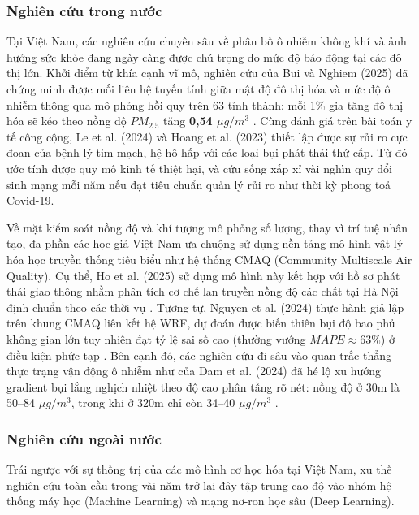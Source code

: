 \subsubsection{Nghiên cứu trong nước}

Tại Việt Nam, các nghiên cứu chuyên sâu về phân bố ô nhiễm không khí và ảnh hưởng sức khỏe đang ngày càng được chú trọng do mức độ báo động tại các đô thị lớn. Khởi điểm từ khía cạnh vĩ mô, nghiên cứu của Bui và Nghiem (2025) đã chứng minh được mối liên hệ tuyến tính giữa mật độ đô thị hóa và mức độ ô nhiễm thông qua mô phỏng hồi quy trên 63 tỉnh thành: mỗi 1\% gia tăng đô thị hóa sẽ kéo theo nồng độ $PM_{2.5}$ tăng \textbf{0,54 $\mu g/m^3$} \cite{bui2025urbanization}. Cùng đánh giá trên bài toán y tế công cộng, Le et al. (2024) \cite{le2024environmental} và Hoang et al. (2023) \cite{hoang2023health} thiết lập được sự rủi ro cực đoan của bệnh lý tim mạch, hệ hô hấp với các loại bụi phát thải thứ cấp. Từ đó ước tính được quy mô kinh tế thiệt hại, và cứu sống xấp xỉ vài nghìn quy đổi sinh mạng mỗi năm nếu đạt tiêu chuẩn quản lý rủi ro như thời kỳ phong toả Covid-19. 

Về mặt kiểm soát nồng độ và khí tượng mô phỏng số lượng, thay vì trí tuệ nhân tạo, đa phần các học giả Việt Nam ưa chuộng sử dụng nền tảng mô hình vật lý - hóa học truyền thống tiêu biểu như hệ thống CMAQ (Community Multiscale Air Quality). 
Cụ thể, Ho et al. (2025) sử dụng mô hình này kết hợp với hồ sơ phát thải giao thông nhằm phân tích cơ chế lan truyền nồng độ các chất tại Hà Nội định chuẩn theo các thời vụ \cite{ho2025assessment}. Tương tự, Nguyen et al. (2024) thực hành giả lập trên khung CMAQ liên kết hệ WRF, dự đoán được biến thiên bụi độ bao phủ không gian lớn tuy nhiên đạt tỷ lệ sai số cao (thường vướng $MAPE \approx 63\%$) ở điều kiện phức tạp \cite{nguyen2024cmaq}. 
Bên cạnh đó, các nghiên cứu đi sâu vào quan trắc thẳng thực trạng vận động ô nhiễm như của Dam et al. (2024) đã hé lộ xu hướng gradient bụi lắng nghịch nhiệt theo độ cao phân tầng rõ nét: nồng độ ở 30m là 50--84 $\mu g/m^3$, trong khi ở 320m chỉ còn 34--40 $\mu g/m^3$ \cite{dam2024pm25}. 

\subsubsection{Nghiên cứu ngoài nước}

Trái ngược với sự thống trị của các mô hình cơ học hóa tại Việt Nam, xu thế nghiên cứu toàn cầu trong vài năm trở lại đây tập trung cao độ vào nhóm hệ thống máy học (Machine Learning) và mạng nơ-ron học sâu (Deep Learning).

